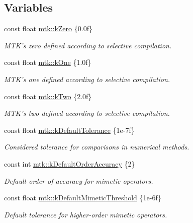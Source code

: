 \subsection*{Variables}
\begin{DoxyCompactItemize}
\item 
const float \hyperlink{group__c01-roots_ga59a451a5fae30d59649bcda274fea271}{mtk\+::k\+Zero} \{0.\+0f\}
\begin{DoxyCompactList}\small\item\em M\+T\+K's zero defined according to selective compilation. \end{DoxyCompactList}\item 
const float \hyperlink{group__c01-roots_ga26407c24d43b6b95480943340d285c71}{mtk\+::k\+One} \{1.\+0f\}
\begin{DoxyCompactList}\small\item\em M\+T\+K's one defined according to selective compilation. \end{DoxyCompactList}\item 
const float \hyperlink{group__c01-roots_gaf39c2d851a2db744f4feb1c5ab3ec2cf}{mtk\+::k\+Two} \{2.\+0f\}
\begin{DoxyCompactList}\small\item\em M\+T\+K's two defined according to selective compilation. \end{DoxyCompactList}\item 
const float \hyperlink{group__c01-roots_gae914b125d81d1b97e0aee7bbc7739786}{mtk\+::k\+Default\+Tolerance} \{1e-\/7f\}
\begin{DoxyCompactList}\small\item\em Considered tolerance for comparisons in numerical methods. \end{DoxyCompactList}\item 
const int \hyperlink{group__c01-roots_ga0d95560098eb36420511103637b6952f}{mtk\+::k\+Default\+Order\+Accuracy} \{2\}
\begin{DoxyCompactList}\small\item\em Default order of accuracy for mimetic operators. \end{DoxyCompactList}\item 
const float \hyperlink{group__c01-roots_ga35718d949bdc81a08a9cc8ebbe3478a2}{mtk\+::k\+Default\+Mimetic\+Threshold} \{1e-\/6f\}
\begin{DoxyCompactList}\small\item\em Default tolerance for higher-\/order mimetic operators. \end{DoxyCompactList}\item 

\end{DoxyCompactItemize}
